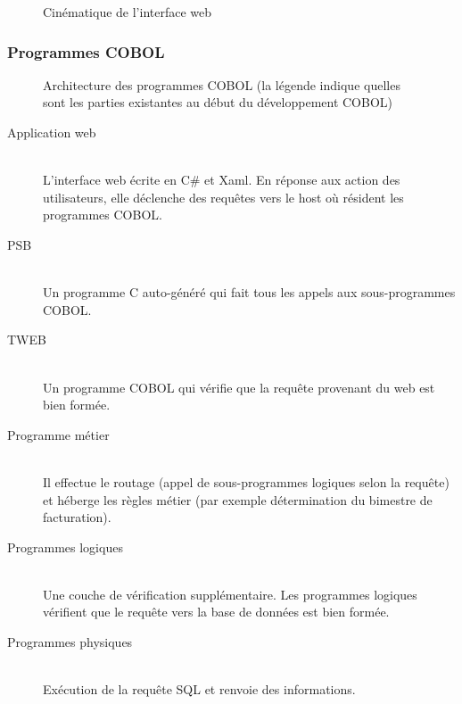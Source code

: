 \documentclass[a4paper,french,12pt]{article}
\begin{document}
			\begin{figure}[h!]
			\caption{Cinématique de l'interface web}
			\centering
			\end{figure} 
		
		
		\subsubsection{Programmes COBOL} 
		
			\begin{figure}[h!]
			\caption{Architecture des programmes COBOL (la légende indique quelles sont les parties existantes au début du développement COBOL)}
			\centering
			\end{figure}
			
			\begin{description}
				 \item[Application web] \hfill \\
				 L'interface web écrite en C\# et Xaml. En réponse aux action des utilisateurs, elle déclenche des requêtes vers le host où résident les programmes COBOL.
				 
				 \item[PSB] \hfill \\
				 Un programme C auto-généré qui fait tous les appels aux sous-programmes COBOL.
				 
				 \item[TWEB] \hfill \\
				 Un programme COBOL qui vérifie que la requête provenant du web est bien formée.
				 
				 \item[Programme métier] \hfill \\
				 Il effectue le routage (appel de sous-programmes logiques selon la requête) et héberge les règles métier (par exemple détermination du bimestre de facturation).
				 
				 \item[Programmes logiques] \hfill \\
				 Une couche de vérification supplémentaire. Les programmes logiques vérifient que le requête vers la base de données est bien formée.
				 
				 \item[Programmes physiques] \hfill \\
				 Exécution de la requête SQL et renvoie des informations.			 			 
			\end{description}
			
\end{document}
